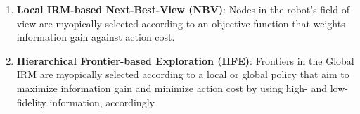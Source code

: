 \documentclass[letterpaper]{article} %
\newcommand{\ph}[1]{{\textbf{#1}:}} %
\begin{document}
\vspace{-4pt}
\begin{enumerate}[label={\arabic*)}]
  \itemsep0em 
  \setlength{\itemsep}{0pt}
  \setlength{\parskip}{0pt}
  \item \ph{Local IRM-based Next-Best-View (NBV)} Nodes in the robot's field-of-view are myopically selected according to an objective function that weights information gain against action cost.  
  \item \ph{Hierarchical Frontier-based Exploration (HFE)} Frontiers in the Global IRM are myopically selected according to a local or global policy that aim to maximize information gain and minimize action cost by using high- and low-fidelity information, accordingly. 
\end{enumerate}
\vspace{-4pt}



    
    
\end{document}
